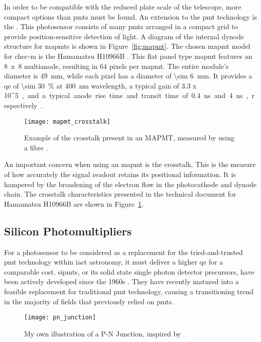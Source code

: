 In order to be compatible with the reduced plate scale of the telescope, more compact options than \glspl{pmt} must be found. An extension to the \gls{pmt} technology is the . This photosensor consists of many \glspl{pmt} arranged in a compact grid to provide position-sensitive detection of light. A diagram of the internal dynode structure for \glspl{mapmt} is shown in Figure~\ref{fig:mapmt}. The chosen \gls{mapmt} model for \gls{chec-m} is the Hamamatsu H10966B . This flat panel type \gls{mapmt} features an 8~x~8 multianode, resulting in 64 pixels per \gls{mapmt}. The entire module's diameter is \SI{49}{mm}, while each pixel has a diameter of \SI{\sim 6}{mm}. It provides a \gls{qe} of \SI{\sim 30}{\percent} at \SI{400}{nm} wavelength, a typical gain of \SI{3.3 x 10^5}, and a typical anode rise time and transit time of \SI{0.4}{ns} and \SI{4}{ns}, respectively \cite{Hamamatsu2011}. 

\begin{figure}
	\centering
    \texttt{[image: mapmt\_crosstalk]} 
	\caption[Multi-anode Photomultiplier Tube crosstalk.]{Example of the crosstalk present in an MAPMT, measured by using a fibre \cite{Hamamatsu2011}.}
	\label{fig:mapmt_crosstalk}
\end{figure}

An important concern when using an \gls{mapmt} is the crosstalk. This is the measure of how accurately the signal readout retains its positional information. It is hampered by the broadening of the electron flow in the photocathode and dynode chain. The crosstalk characteristics presented in the technical document for Hamamatsu H10966B are shown in Figure~\ref{fig:mapmt_crosstalk}.

\subsection{Silicon Photomultipliers}

For a photosensor to be considered as a replacement for the tried-and-trusted \gls{pmt} technology within \gls{iact} astronomy, it must deliver a higher \gls{qe} for a comparable cost. \glspl{sipmt}, or its solid state single photon detector precursors, have been actively developed since the 1960s \cite{Renker2006}. They have recently matured into a feasible replacement for traditional \gls{pmt} technology, causing a transitioning trend in the majority of fields that previously relied on \glspl{pmt}. 

\begin{figure}
	\centering
    \texttt{[image: pn\_junction]} 
	\caption[A typical illustration of a P-N Junction.]{My own illustration of a P-N Junction, inspired by \textcite{Ghassemi2017}.}
	\label{fig:pn_junction}
\end{figure}

